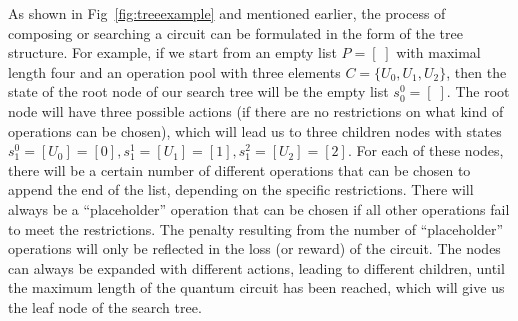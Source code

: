 \documentclass[a4paper,onecolumn,11pt]{quantumarticle}
\begin{document}
As shown in Fig~\ref{fig:treeexample} and mentioned earlier, the process of composing or searching a circuit can be formulated in the form of the tree structure. For example, if we start from an empty list $P = [\;]$ with maximal length four and an operation pool with three elements $C = \{U_0, U_1, U_2\}$, 
then the state of the root node of our search tree will be the empty list $s_0^0 = [\;]$. The root node will have three possible actions (if there are no restrictions on what kind of operations can be chosen), which will lead us to three children nodes with states $s_1^0 = [U_0]=[0], s_1^1 = [U_1]=[1], s_1^2=[U_2] = [2]$. For each of these nodes, there will be a certain number of different operations that can be chosen to append the end of the list, depending on the specific restrictions. There will always be a ``placeholder'' operation that can be chosen if all other operations fail to meet the restrictions. The penalty resulting from the number of ``placeholder'' operations will only be reflected in the loss (or reward) of the circuit. The nodes can always be expanded with different actions, leading to different children, until the maximum length of the quantum circuit has been reached, which will give us the leaf node of the search tree. 
\end{document}
